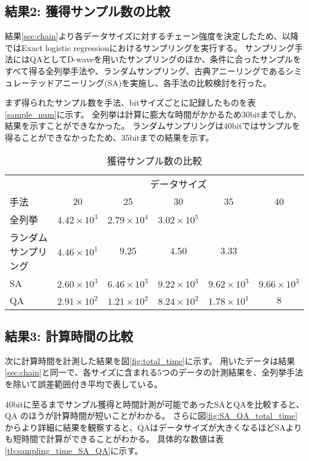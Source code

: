 \documentclass[12pt, dvipdfmx]{jmaster}
\theoremstyle{definition}
\begin{document}
\subsection{結果2: 獲得サンプル数の比較}
\label{sec:time_compare}
結果\ref{sec:chain}より各データサイズに対するチェーン強度を決定したため、以降ではExact logistic regressionにおけるサンプリングを実行する。
サンプリング手法にはQAとしてD-waveを用いたサンプリングのほか、条件に合ったサンプルをすべて得る全列挙手法や、ランダムサンプリング、古典アニーリングであるシミュレーテッドアニーリング(SA)を実施し、各手法の比較検討を行った。

まず得られたサンプル数を手法、bitサイズごとに記録したものを表\ref{sample_num}に示す。
全列挙は計算に膨大な時間がかかるため30bitまでしか、結果を示すことができなかった。
ランダムサンプリングは40bitではサンプルを得ることができなかったため、35bitまでの結果を示す。

\begin{table}[hbtp]
	\caption{獲得サンプル数の比較}
	\label{tb:sample_num}
	\centering
	\begin{tabular}{lccccc}
		\hline
		&\multicolumn{5}{c}{データサイズ} \\
		手法& 20 & 25 & 30 & 35 & 40 \\
		\hline\hline
		全列挙 & $4.42\times 10^{3}$ & $2.79\times 10^{4}$ & $3.02\times 10^{5}$ & &  \\
		ランダムサンプリング & $4.46\times 10^{1}$ & $9.25$ & $4.50$ & $3.33$ & \\
		SA & $2.60\times 10^{3}$ & $6.46\times 10^{3}$ & $9.22\times 10^{3}$ & $9.62\times 10^{3}$ & $9.66\times 10^{3}$ \\
		QA & $2.91\times 10^{2}$ & $1.21\times 10^{2}$ & $8.24\times 10^{2}$ & $1.78\times 10^{1}$ & $8$ \\
		\hline
	\end{tabular}
\end{table}

\subsection{結果3: 計算時間の比較}
次に計算時間を計測した結果を図\ref{fig:total_time}に示す。
用いたデータは結果\ref{sec:chain}と同一で、各サイズに含まれる5つのデータの計測結果を、全列挙手法を除いて誤差範囲付き平均で表している。

40bitに至るまでサンプル獲得と時間計測が可能であったSAとQAを比較すると、QA のほうが計算時間が短いことがわかる。
さらに図\ref{fig:SA_QA_total_time}からより詳細に結果を観察すると、QAはデータサイズが大きくなるほどSAよりも短時間で計算ができることがわかる。
具体的な数値は表\ref{tb:sampling_time_SA_QA}に示す。
\end{document}
